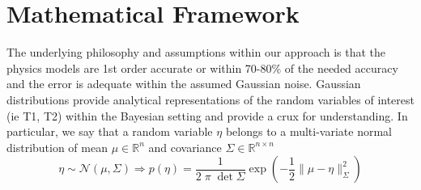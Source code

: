 \documentclass{article}         %
\theoremstyle{definition}
\theoremstyle{remark}
\begin{document}
\section{ Mathematical Framework}\label{GeneralMathFramework}

The underlying philosophy and assumptions within our approach is that the physics 
models are 1st order accurate or within 70-80\% of the needed accuracy and the error is
adequate within the assumed Gaussian noise.
Gaussian distributions provide analytical representations of the random
variables of interest (ie T1, T2) within the Bayesian setting and 
provide a crux for understanding. In particular, we say that a random
variable $\eta$ belongs to a multi-variate normal distribution 
of mean $\mu \in \mathbb{R}^n $ and covariance $\Sigma \in \mathbb{R}^{n \times n}$
\[
     \eta \sim \mathcal{N}(\mu,\Sigma)  
    \Rightarrow
      p(\eta)  = \frac{1}{2 \; \pi \; \det{\Sigma}} \exp\left( - \frac{1}{2} \| \mu - \eta\|^2_{\Sigma}\right)
\]
\end{document}
